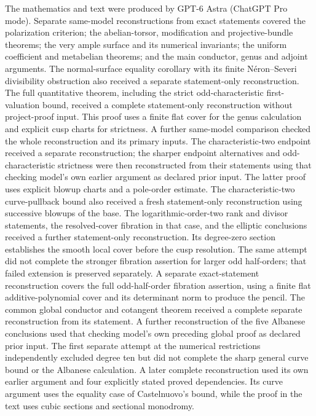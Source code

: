 \documentclass[11pt]{article}
\theoremstyle{remark}\newtheorem{remark}[theorem]{Remark}
\begin{document}
The mathematics and text were produced by GPT-6 Astra (ChatGPT Pro mode).
Separate same-model reconstructions from exact statements covered the
polarization criterion; the abelian-torsor, modification and projective-bundle
theorems; the very ample surface and its numerical invariants; the uniform
coefficient and metabelian theorems; and the main conductor, genus and adjoint
arguments. The normal-surface equality corollary with its finite
N\'eron--Severi divisibility obstruction also received a separate
statement-only reconstruction. The full quantitative theorem, including
the strict odd-characteristic first-valuation bound, received a complete
statement-only reconstruction without project-proof input. This proof
uses a finite flat cover for the genus calculation and explicit cusp
charts for strictness. A further same-model comparison checked the whole
reconstruction and its primary inputs.
The characteristic-two endpoint received a separate reconstruction;
the sharper endpoint alternatives and odd-characteristic strictness
were then reconstructed from their statements using that checking
model's own earlier argument as declared prior input. The latter
proof uses explicit blowup charts and a pole-order estimate.
The characteristic-two curve-pullback bound also received a fresh
statement-only reconstruction using successive blowups of the base.
The logarithmic-order-two rank and divisor statements, the resolved-cover
fibration in that case, and the elliptic conclusions received a further
statement-only reconstruction. Its degree-zero section establishes the
smooth local cover before the cusp resolution. The same attempt did not
complete the stronger fibration assertion for larger odd
half-orders; that failed extension is preserved separately.
A separate exact-statement reconstruction covers the full odd-half-order
fibration assertion, using a finite flat additive-polynomial cover
and its determinant norm to produce the pencil.
The common global conductor and cotangent theorem received a complete
separate reconstruction from its statement. A further reconstruction
of the five Albanese conclusions used that checking model's own
preceding global proof as declared prior input.
The first separate attempt at the numerical restrictions independently
excluded degree ten but did not complete the sharp general curve bound
or the Albanese calculation. A later complete reconstruction used its
own earlier argument and four explicitly stated proved dependencies.
Its curve argument uses the equality case of Castelnuovo's bound,
while the proof in the text uses cubic sections and sectional monodromy.
\end{document}
